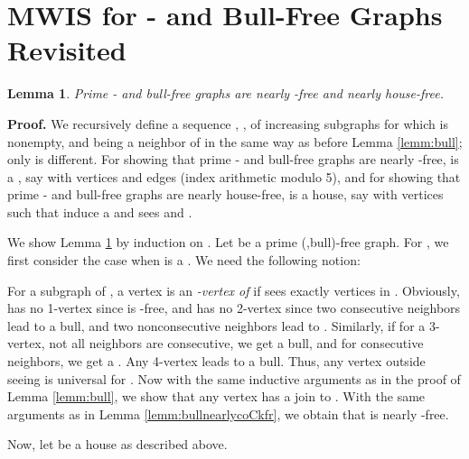 \documentclass[11pt]{article}
\newcommand{\0}{\text{ has a co-join to }}
\newcommand{\1}{\text{ has a join to }}
\newtheorem{lemm}{Lemma}
\begin{document}
\section{MWIS for - and Bull-Free Graphs Revisited}\label{P5bullfr}

\begin{lemm}\label{lemm:bullnearlyC5housefr}
Prime - and bull-free graphs are nearly -free and nearly house-free.
\end{lemm}
 
\noindent 
{\bf Proof.}
We recursively define a sequence , , of increasing subgraphs for which  is nonempty,  and  being a neighbor of  in the same way as before Lemma \ref{lemm:bull}; only  is different. For showing that prime - and bull-free graphs are nearly -free,  is a , say with vertices  and edges  (index arithmetic modulo 5), and for showing that prime - and bull-free graphs are nearly house-free,  is a house, say with vertices  such that  induce a  and  sees  and . 
  
We show Lemma \ref{lemm:bullnearlyC5housefr} by induction on . Let  be a prime (,bull)-free graph. For , we first consider the case when  is a . We need the following notion: 

For a subgraph  of , a vertex  is an {\em -vertex of } if  sees exactly  vertices in . Obviously,  has no 1-vertex since  is -free, and  has no 2-vertex since two consecutive neighbors lead to a bull, and two nonconsecutive neighbors lead to . Similarly, if for a 3-vertex, not all neighbors are consecutive, we get a bull, and for consecutive neighbors, we get a . Any 4-vertex leads to a bull. Thus, any vertex outside  seeing  is universal for . Now with the same inductive arguments as in the proof of Lemma \ref{lemm:bull},
we show that any vertex  has a join to . With the same arguments as in Lemma \ref{lemm:bullnearlycoCkfr}, we obtain that  is nearly -free. 

\medskip
Now, let  be a house as described above.  
\end{document}
